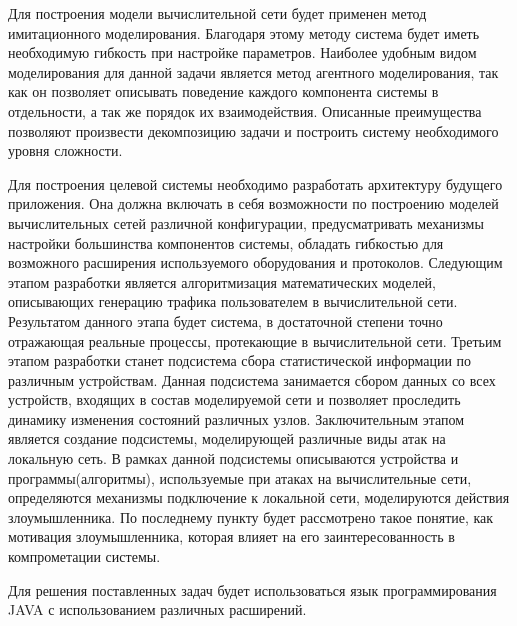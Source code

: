     Для построения модели вычислительной сети будет применен метод имитационного моделирования. Благодаря этому методу система будет иметь необходимую гибкость при настройке параметров. Наиболее удобным видом моделирования для данной задачи является метод агентного моделирования, так как он позволяет описывать поведение каждого компонента системы в отдельности, а так же порядок их взаимодействия. Описанные преимущества позволяют произвести декомпозицию задачи и построить систему необходимого уровня сложности.
    
    Для построения целевой системы необходимо разработать архитектуру будущего приложения. Она должна включать в себя возможности по построению моделей вычислительных сетей различной конфигурации, предусматривать механизмы настройки большинства компонентов системы, обладать гибкостью для возможного расширения используемого оборудования и протоколов. Следующим этапом разработки является алгоритмизация математических моделей, описывающих генерацию трафика пользователем в вычислительной сети. Результатом данного этапа будет система, в достаточной степени точно отражающая реальные процессы, протекающие в вычислительной сети. Третьим этапом разработки станет подсистема сбора статистической информации по различным устройствам. Данная подсистема занимается сбором данных со всех устройств, входящих в состав моделируемой сети и позволяет проследить динамику изменения состояний различных узлов. Заключительным этапом является создание подсистемы, моделирующей различные виды атак на локальную сеть. В рамках данной подсистемы описываются устройства и программы(алгоритмы), используемые при атаках на вычислительные сети, определяются механизмы подключение к локальной сети, моделируются действия злоумышленника. По последнему пункту будет рассмотрено такое понятие, как мотивация злоумышленника, которая влияет на его заинтересованность в компрометации системы. 
    
    Для решения поставленных задач будет использоваться язык программирования JAVA с использованием различных расширений.


